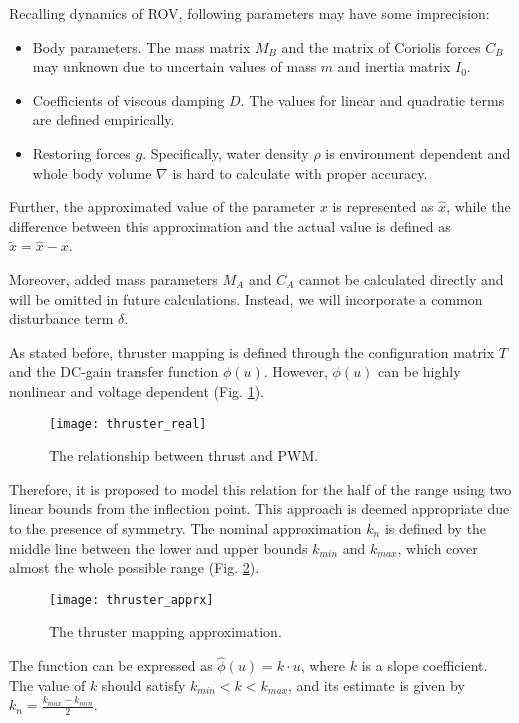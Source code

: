     Recalling dynamics of ROV, following parameters may have some imprecision:
    \begin{itemize}
        \item Body parameters. The mass matrix $M_B$ and the matrix of Coriolis forces $C_B$ 
        may unknown due to uncertain values of mass $m$ and inertia matrix $I_0$.
        \item Coefficients of viscous damping $D$. The values for linear and quadratic 
        terms are defined empirically.
        \item Restoring forces $g$. Specifically, water density $\rho$ is environment dependent 
        and whole body volume $\nabla$ is hard to calculate with proper accuracy.
    \end{itemize}
    Further, the approximated value of the parameter $x$ is represented as $\hat x$,
    while the difference between this approximation and the actual value is 
    defined as $\tilde x = \hat x - x$.

    Moreover, added mass parameters $M_A$ and $C_A$ cannot be calculated directly and will 
    be omitted in future calculations. Instead, we will incorporate a common disturbance 
    term $\delta$. 

    As stated before, thruster mapping is defined through the configuration 
    matrix $T$ and the DC-gain transfer function $\phi(u)$. However, $\phi(u)$ 
    can be highly nonlinear and voltage dependent (Fig. \ref{image:thrust}).
    \begin{figure}[H]
        \centering\texttt{[image: thruster\_real]}
        \caption{The relationship between thrust and PWM.}
        \label{image:thrust}
    \end{figure}
    Therefore, it is proposed to model this relation for the half of the range 
    using two linear bounds from the inflection point. This approach is deemed appropriate 
    due to the presence of symmetry. The nominal approximation $k_n$ is defined by the middle line between 
    the lower and upper bounds $k_{min}$ and $k_{max}$, which cover almost the whole possible range (Fig. \ref{image:thrust_apprx}).
    \begin{figure}[H]
        \centering\texttt{[image: thruster\_apprx]}
        \caption{The thruster mapping approximation.}
        \label{image:thrust_apprx}
    \end{figure}
    The function can be expressed as $\hat{\phi}(u) = k\cdot u$, where $k$ is a slope 
    coefficient. The value of $k$ should satisfy $k_{min} < k < k_{max}$, and its estimate 
    is given by $k_n = \frac{k_{max} - k_{min}}{2}$.
    

